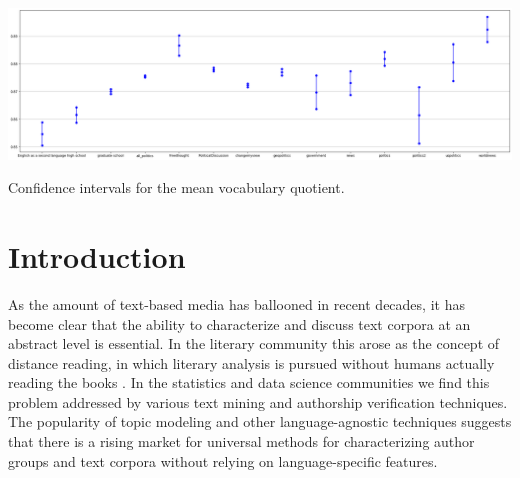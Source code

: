 \documentclass[sigconf]{acmart}
\begin{document}



\begin{teaserfigure}
  \centering
  \includegraphics[width=\textwidth]{images/confidenceintervals}
  \caption{Confidence intervals for the mean vocabulary quotient.}
  \label{fig:teaser}
\end{teaserfigure}

\maketitle

\section{Introduction}

As the amount of text-based media has ballooned in recent decades, it has
become clear that the ability to characterize and discuss text corpora at an
abstract level is essential. In the literary community this arose as the
concept of distance reading, in which literary analysis is pursued without
humans actually reading the books \cite{moretti2000conjectures}. In the
statistics and data science communities we find this problem addressed by
various text mining and authorship verification techniques. The popularity
of topic modeling and other language-agnostic techniques suggests that there
is a rising market for universal methods for characterizing author groups
and text corpora without relying on language-specific features. 
\end{document}
